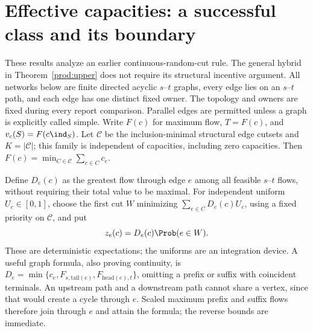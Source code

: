 \section{Effective capacities: a successful class and its boundary}
\label{net:effective}
These results analyze an earlier continuous-random-cut rule.  The general
hybrid in Theorem~\ref{prod:upper} does not require its structural incentive
argument.  All networks below are finite directed acyclic $s$--$t$ graphs,
every edge lies on an $s$--$t$ path, and each edge has one distinct fixed owner.
The topology and owners are fixed during every report comparison.  Parallel
edges are permitted unless a graph is explicitly called simple.
Write $F(c)$ for maximum flow, $T=F(c)$, and $v_c(S)=F(c\ind_S)$.
Let $\mathcal C$ be the inclusion-minimal structural edge cutsets and
$K=|\mathcal C|$; this family is independent of capacities, including zero
capacities.  Then $F(c)=\min_{C\in\mathcal C}\sum_{e\in C}c_e$.

Define $D_e(c)$ as the greatest flow through edge $e$ among all feasible
$s$--$t$ flows, without requiring their total value to be maximal.
For independent uniform $U_e\in[0,1]$, choose the first cut $W$ minimizing
$\sum_{e\in C}D_e(c)U_e$, using a fixed priority on $\mathcal C$, and put
\begin{equation}\label{net:base-rule}
 z_e(c)=D_e(c)\Prob(e\in W).
\end{equation}
These are deterministic expectations; the uniforms are an integration device.
A useful graph formula, also proving continuity, is
$D_e=\min\{c_e,F_{s,\mathrm{tail}(e)},F_{\mathrm{head}(e),t}\}$,
omitting a prefix or suffix with coincident terminals.  An upstream path and
a downstream path cannot share a vertex, since that would create a cycle
through $e$.  Scaled maximum prefix and suffix flows therefore join through
$e$ and attain the formula; the reverse bounds are immediate.

